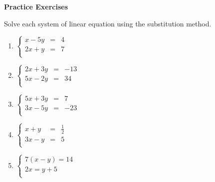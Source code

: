 \textbf{Practice Exercises}

\vspce
Solve each system of linear equation using the substitution method. 

\begin{enumerate}[label = \arabic*. ]

\item \hspce $%
\left\{
\begin{array}{ccl}
x-5y & = & 4 \\
2x+y & = & 7 \\
\end{array}
\right. $
\vspce 
\item \hspce $%
\left\{
\begin{array}{ccl}
2x+3y & = & -13 \\
5x-2y & = & 34 \\
\end{array}
\right. $
\vspce 
\item \hspce $%
\left\{
\begin{array}{ccl}
5x+3y & = & 7 \\
3x-5y & = & -23 \\
\end{array}
\right. $
\vspce 
\item \hspce $%
\left\{
\begin{array}{ccl}
x+y & = & \displaystyle  \frac{1}{2} \\
3x-y & = & 5 \\
\end{array}
\right. 
$
\vspce 
\item \hspce $%
\left\{
\begin{array}{l}
7(x-y)  =  14 \\
2x  =  y+5\\
\end{array}
\right. $

\end{enumerate}